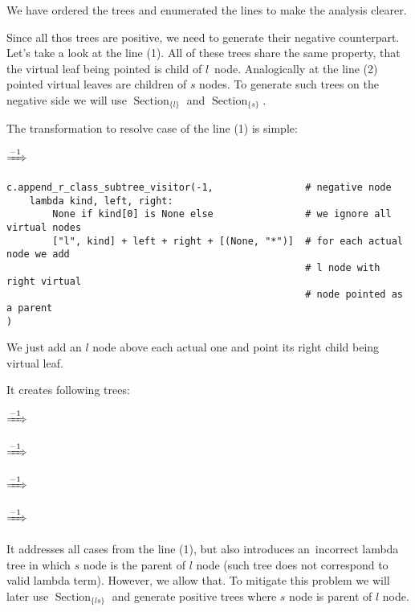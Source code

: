 \documentclass[final]{article}
\theoremstyle{definition}
\theoremstyle{definition}
\theoremstyle{remark}
\DeclareMathOperator{\tSection}{\text{Section}}
\newcommand{\includeinlinesvg}[2]{\begin{minipage}{#1\textwidth}\end{minipage}}
\newcommand{\includeinlinescaledsvg}[3]{\begin{minipage}{#1\textwidth}\begin{center}\end{center}\end{minipage}}
\begin{document}
We have ordered the trees and enumerated the lines to make the analysis clearer.

Since all thos trees are positive, we need to generate their negative counterpart. Let's take a look at the line (1). All of these trees share the same property, that the virtual leaf being pointed is child of \(l\)~node. Analogically at the line (2) pointed virtual leaves are children of \(s\) nodes. To generate such trees on the negative side we will use \(\tSection_{\{l\}}\) and \(\tSection_{\{s\}}\).

The transformation to resolve case of the line (1) is simple:

\begin{center}
    \includeinlinescaledsvg{.4}{.7}{lambda__transformations__002a}%
    \(\xRightarrow{-1}\)%
    \includeinlinescaledsvg{.4}{.7}{lambda__transformations__002b}%
\end{center}

\begin{lstlisting}
c.append_r_class_subtree_visitor(-1,                # negative node
    lambda kind, left, right:
        None if kind[0] is None else                # we ignore all virtual nodes
        ["l", kind] + left + right + [(None, "*")]  # for each actual node we add
                                                    # l node with right virtual
                                                    # node pointed as a parent
)
\end{lstlisting}

We just add an \(l\) node above each actual one and point its right child being virtual leaf.

It creates following trees:

\includeinlinesvg{.24}{lambda__trees_100__0_base}\(\xRightarrow{-1}\)\includeinlinesvg{.24}{lambda__trees_100__0}%
\includeinlinesvg{.24}{lambda__trees_100__1_base}\(\xRightarrow{-1}\)\includeinlinesvg{.24}{lambda__trees_100__1}%

\includeinlinesvg{.24}{lambda__trees_100__2_base}\(\xRightarrow{-1}\)\includeinlinesvg{.24}{lambda__trees_100__2}%
\includeinlinesvg{.24}{lambda__trees_100__3_base}\(\xRightarrow{-1}\)\includeinlinesvg{.24}{lambda__trees_100__3}%

It addresses all cases from the line (1), but also introduces an~incorrect lambda tree in which \(s\) node is the parent of \(l\) node (such tree does not correspond to valid lambda term). However, we allow that. To mitigate this problem we will later use \(\tSection_{\{ls\}}\) and generate positive trees where \(s\) node is parent of \(l\) node.
\end{document}
